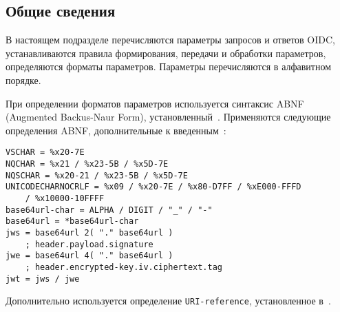 \label{PARAMS}

\subsection{Общие сведения}\label{PARAMS.Syntax}

В настоящем подразделе перечисляются параметры запросов и ответов OIDC, 
устанавливаются правила формирования, передачи и обработки параметров, 
определяются форматы параметров.
%
Параметры перечисляются в алфавитном порядке.

При определении форматов параметров используется синтаксис ABNF (Augmented 
Backus-Naur Form), установленный~\cite{RFC5234}. 
%
Применяются следующие определения ABNF, дополнительные к 
введенным~\cite{RFC5234}:
%
\begin{lstlisting}
VSCHAR = %x20-7E
NQCHAR = %x21 / %x23-5B / %x5D-7E
NQSCHAR = %x20-21 / %x23-5B / %x5D-7E
UNICODECHARNOCRLF = %x09 / %x20-7E / %x80-D7FF / %xE000-FFFD 
    / %x10000-10FFFF
base64url-char = ALPHA / DIGIT / "_" / "-"
base64url = *base64url-char
jws = base64url 2( "." base64url )
    ; header.payload.signature
jwe = base64url 4( "." base64url )
    ; header.encrypted-key.iv.ciphertext.tag
jwt = jws / jwe
\end{lstlisting}

Дополнительно используется определение \lstinline{URI-reference}, 
установленное в~\cite{RFC3986}.


